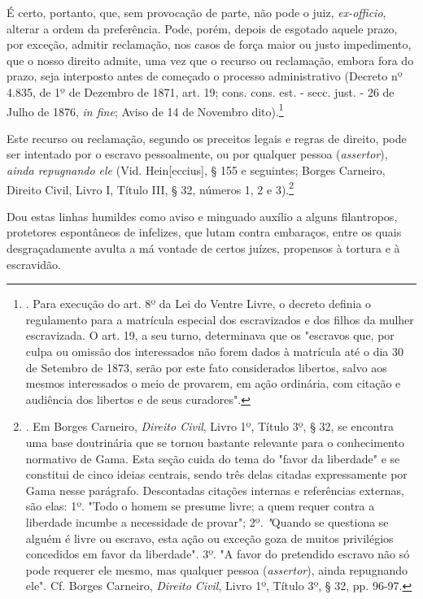 É certo, portanto, que, sem provocação de parte, não pode o juiz,
\emph{ex-officio}, alterar a ordem da preferência. Pode, porém, depois
de esgotado aquele prazo, por exceção, admitir reclamação, nos casos de
força maior ou justo impedimento, que o nosso direito admite, uma vez
que o recurso ou reclamação, embora fora do prazo, seja interposto antes
de começado o processo administrativo (Decreto nº 4.835, de 1º de
Dezembro de 1871, art. 19; cons. cons. est. - secc. just. - 26 de Julho
de 1876, \emph{in fine}; Aviso de 14 de Novembro dito).\footnote{. Para
  execução do art. 8º da Lei do Ventre Livre, o decreto definia o
  regulamento para a matrícula especial dos escravizados e dos filhos da
  mulher escravizada. O art. 19, a seu turno, determinava que os
  "escravos que, por culpa ou omissão dos interessados não forem dados à
  matrícula até o dia 30 de Setembro de 1873, serão por este fato
  considerados libertos, salvo aos mesmos interessados o meio de
  provarem, em ação ordinária, com citação e audiência dos libertos e de
  seus curadores".}

Este recurso ou reclamação, segundo os preceitos legais e regras de
direito, pode ser intentado por o escravo pessoalmente, ou por qualquer
pessoa (\emph{assertor}), \emph{ainda repugnando ele} (Vid.
Hein{[}eccius{]}, § 155 e seguintes; Borges Carneiro, Direito Civil,
Livro I, Título III, § 32, números 1, 2 e 3).\footnote{. Em Borges
  Carneiro, \emph{Direito Civil}, Livro 1º, Título 3º, § 32, se encontra
  uma base doutrinária que se tornou bastante relevante para o
  conhecimento normativo de Gama. Esta seção cuida do tema do "favor da
  liberdade" e se constitui de cinco ideias centrais, sendo três delas
  citadas expressamente por Gama nesse parágrafo. Descontadas citações
  internas e referências externas, são elas: 1º. "Todo o homem se
  presume livre; a quem requer contra a liberdade incumbe a necessidade
  de provar"; 2º. \emph{"}Quando se questiona se alguém é livre ou
  escravo, esta ação ou exceção goza de muitos privilégios concedidos em
  favor da liberdade". 3º. "A favor do pretendido escravo não só pode
  requerer ele mesmo, mas qualquer pessoa (\emph{assertor}), ainda
  repugnando ele". Cf. Borges Carneiro, \emph{Direito Civil}, Livro 1º,
  Título 3º, § 32, pp. 96-97.}

Dou estas linhas humildes como aviso e minguado auxílio a alguns
filantropos, protetores espontâneos de infelizes, que lutam contra
embaraços, entre os quais desgraçadamente avulta a má vontade de certos
juízes, propensos à tortura e à escravidão.

